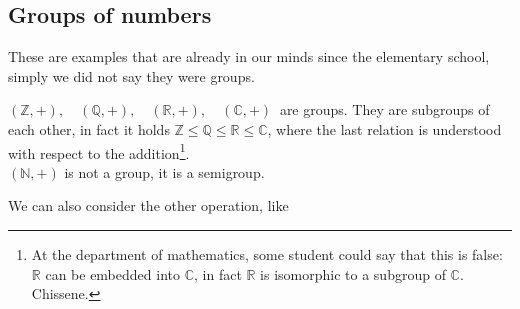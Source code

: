 \documentclass[../main.tex]{subfiles}
\begin{document}
\subsection{Groups of numbers}
These are examples that are already in our minds since the elementary school, simply we did not say they were groups.
\begin{example}
\((\mathbb{Z},+), \quad (\mathbb{Q}, +), \quad (\mathbb{R}, +), \quad (\mathbb{C}, +)\ \) are groups. They are subgroups of each other, in fact it holds \(\mathbb{Z}\leq \mathbb{Q}\leq\mathbb{R}\leq\mathbb{C}\), where the last relation is understood with respect to the addition\footnote{At the department of mathematics, some student could say that this is false: $\mathbb{R}$ can be embedded into $\mathbb{C}$, in fact $\mathbb{R}$ is isomorphic to a subgroup of $\mathbb{C}$. Chissene.}.\\
{\selectfont{}\relax} $(\mathbb{N}, +)$ is not a group, it is a semigroup.
\end{example}
We can also consider the other operation, like
\end{document}
